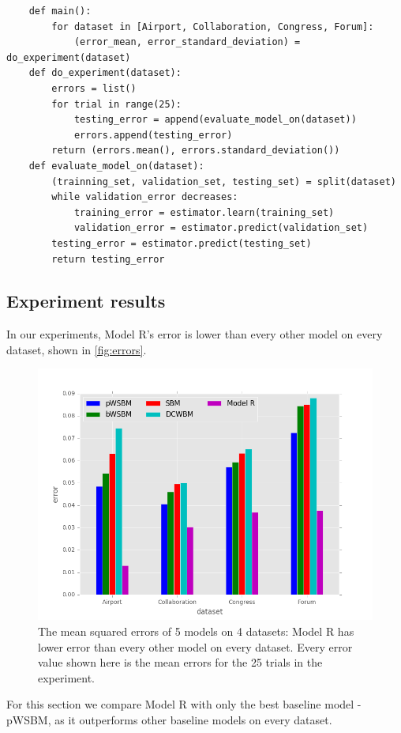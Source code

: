 \documentclass[letterpaper]{article}
\begin{document}
\begin{lstlisting}
	def main():
		for dataset in [Airport, Collaboration, Congress, Forum]:
			(error_mean, error_standard_deviation) = do_experiment(dataset)
	def do_experiment(dataset):
		errors = list()
		for trial in range(25):
			testing_error = append(evaluate_model_on(dataset))
			errors.append(testing_error)
		return (errors.mean(), errors.standard_deviation())
	def evaluate_model_on(dataset):
		(trainning_set, validation_set, testing_set) = split(dataset)
		while validation_error decreases:
			training_error = estimator.learn(training_set)
			validation_error = estimator.predict(validation_set)
		testing_error = estimator.predict(testing_set)
		return testing_error
\end{lstlisting}

\subsection{Experiment results}
In our experiments,
Model R's error is lower than every other model on every dataset,
shown in \autoref{fig:errors}.
\begin{figure}[!htb]
	\centering
	\includegraphics[width=\textwidth]{link-weight-errors}
	\caption[content...]{
		The mean squared errors of 5 models on 4 datasets:
		Model R has lower error than every other model on every dataset.
		Every error value shown here is the mean errors for the 25 trials in the experiment.
	}
	\label{fig:errors}
\end{figure}
For this section we compare Model R with only the best baseline model - pWSBM, as it outperforms other baseline models on every dataset.
\end{document}
